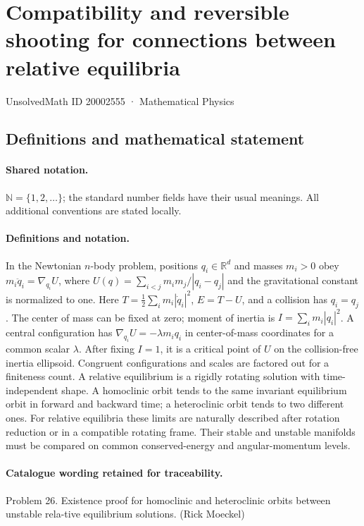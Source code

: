 \documentclass[11pt]{article}
\begin{document}
\setcounter{section}{20002554}
\section{Compatibility and reversible shooting for connections between relative equilibria}\label{20002555}
{\small UnsolvedMath ID 20002555 · Mathematical Physics}
\subsection{Definitions and mathematical statement}

\paragraph{Shared notation.}$\mathbb N=\{1,2,\ldots\}$; the standard number fields have their usual meanings. All additional conventions are stated locally.


\paragraph{Definitions and notation.}In the Newtonian $n$-body problem, positions $q_i\in\mathbb R^d$ and masses $m_i>0$ obey $m_i\ddot q_i=\nabla_{q_i}U$, where $U(q)=\sum_{i<j}m_im_j/|q_i-q_j|$ and the gravitational constant is normalized to one. Here $T=\tfrac12\sum_i m_i|\dot q_i|^2$, $E=T-U$, and a collision has $q_i=q_j$. The center of mass can be fixed at zero; moment of inertia is $I=\sum_i m_i|q_i|^2$. A central configuration has $\nabla_{q_i}U=-\lambda m_iq_i$ in center-of-mass coordinates for a common scalar $\lambda$. After fixing $I=1$, it is a critical point of $U$ on the collision-free inertia ellipsoid. Congruent configurations and scales are factored out for a finiteness count. A relative equilibrium is a rigidly rotating solution with time-independent shape. A homoclinic orbit tends to the same invariant equilibrium orbit in forward and backward time; a heteroclinic orbit tends to two different ones. For relative equilibria these limits are naturally described after rotation reduction or in a compatible rotating frame. Their stable and unstable manifolds must be compared on common conserved-energy and angular-momentum levels.

\paragraph{Catalogue wording retained for traceability.}
Problem 26. Existence proof for homoclinic and heteroclinic orbits between unstable rela-tive equilibrium solutions. (Rick Moeckel)
\end{document}
